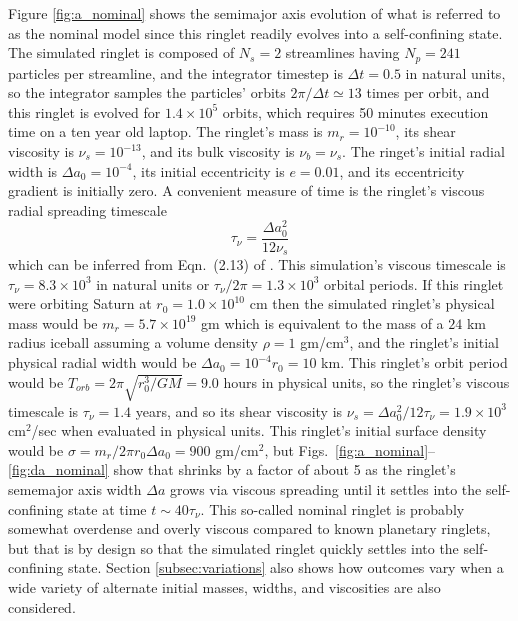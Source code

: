\documentclass[preprint]{aastex62}
\begin{document}
Figure \ref{fig:a_nominal} shows the semimajor axis evolution of what is referred to
as the nominal model since this ringlet readily evolves into a self-confining state.
The simulated ringlet is composed of $N_s=2$ streamlines having $N_p=241$ particles
per streamline, and the integrator timestep is $\Delta t=0.5$ in natural units, so
the integrator samples the particles' orbits $2\pi/\Delta t\simeq13$ times per orbit, and this
ringlet is evolved for $1.4\times10^5$ orbits, which requires 50 minutes execution time
on a ten year old laptop. The ringlet's mass is
$m_r=10^{-10}$, its shear viscosity is $\nu_s=10^{-13}$, and its
bulk viscosity is $\nu_b=\nu_s$. The ringet's initial radial width is
$\Delta a_0 = 10^{-4}$, its initial eccentricity is $e=0.01$, and its
eccentricity gradient is initially zero. A convenient measure of time is the ringlet's
viscous radial spreading timescale
\begin{equation}
\label{eqn:viscous-timesscale}
    \tau_\nu=\frac{\Delta a_0^2}{12\nu_s} 
\end{equation}
which can be inferred from Eqn.\ (2.13) of \cite{P81}. 
This simulation's viscous timescale is $\tau_\nu=8.3\times10^3$ in natural units
or $\tau_\nu/2\pi=1.3\times10^3$ orbital periods. If this ringlet were orbiting Saturn
at $r_0=1.0\times10^{10}$ cm then the simulated ringlet's physical mass
would be $m_r=5.7\times10^{19}$ gm which is equivalent to the mass of a $24$ km radius iceball assuming
a volume density $\rho=1$ gm/cm$^3$, and the ringlet's initial physical radial width would be
$\Delta a_0 = 10^{-4}r_0=10$ km. This ringlet's
orbit period would be $T_{orb}=2\pi\sqrt{r_0^3/GM}=9.0$ hours in physical units, so 
the ringlet's viscous timescale is $\tau_\nu=1.4$ years, and
so its shear viscosity is $\nu_s=\Delta a_0^2/12\tau_\nu = 1.9\times10^3$ cm$^2$/sec
when evaluated in physical units. 
This ringlet's initial surface density would be $\sigma=m_r/2\pi r_0\Delta a_0=900$ gm/cm$^2$, but
Figs.\ \ref{fig:a_nominal}--\ref{fig:da_nominal} show that shrinks by a factor of about 5 as the 
ringlet's sememajor axis width $\Delta a$ grows via viscous spreading until it settles into
the self-confining state at time $t\sim40\tau_\nu$.
This so-called nominal ringlet is probably somewhat overdense and overly viscous compared to known 
planetary ringlets,
but that is by design so that the simulated ringlet quickly settles into the self-confining state.
Section \ref{subsec:variations} also shows how outcomes vary 
when a wide variety of alternate initial masses, widths, and viscosities are also considered.
\end{document}
